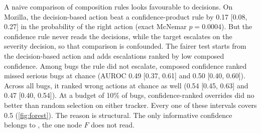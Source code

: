 \begin{colfigure}
\centering
{}
\caption{Row-normalized confusion of \score{} against reference
severity. On both trackers the middle column absorbs mass from both
extremes.}
\label{fig:sev}
\end{colfigure}

A naive comparison of composition rules looks favourable to decisions. On Mozilla, the decision-based action beat a
confidence-product rule by 0.17 [0.08, 0.27] in the probability of the
right action (exact McNemar $p = 0.0004$). But the confidence rule never
reads the decisions, while the target escalates on the severity
decision, so that comparison is confounded. The fairer test starts from
the decision-based action and adds escalations ranked by low composed
confidence. Among
bugs the rule did not escalate, composed confidence ranked missed serious
bugs at chance (AUROC 0.49 [0.37, 0.61] and 0.50 [0.40, 0.60]). Across all bugs, it ranked wrong actions at
chance as well (0.54 [0.45, 0.63] and 0.47 [0.40, 0.54]). At a budget of 10\% of bugs,
confidence-ranked overrides did no better than random selection on
either tracker. Every one of these intervals
covers 0.5 (\cref{fig:forest}). The reason is structural. The only
informative confidence belongs to \choice{}, the one node $F$ does not
read.

